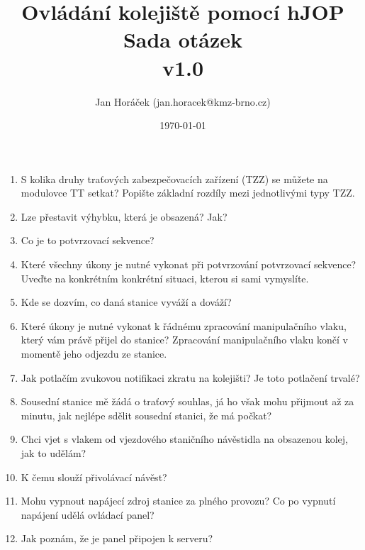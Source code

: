 \documentclass[12pt,a4paper]{article}
\begin{document}
\thispagestyle{empty}
\noindent

\title{
\Large Ovládání kolejiště pomocí hJOP\\
\LARGE Sada otázek\\
\small v1.0}
\author{Jan Horáček (jan.horacek@kmz-brno.cz)}
\date{\today}
\maketitle

\begin{enumerate}
	\item S kolika druhy traťových zabezpečovacích zařízení (TZZ) se můžete na modulovce TT setkat? Popište základní rozdíly mezi jednotlivými typy TZZ.
	
	\item Lze přestavit výhybku, která je obsazená? Jak?
	
	\item Co je to potvrzovací sekvence?
	
	\item Které všechny úkony je nutné vykonat při potvrzování potvrzovací sekvence? Uveďte na konkrétním konkrétní situaci, kterou si sami vymyslíte.
	
	\item Kde se dozvím, co daná stanice vyváží a dováží?
	
	\item Které úkony je nutné vykonat k řádnému zpracování manipulačního vlaku, který vám právě přijel do stanice? Zpracování manipulačního vlaku končí v momentě jeho odjezdu ze stanice.
	
	\item Jak potlačím zvukovou notifikaci zkratu na kolejišti? Je toto potlačení trvalé?
	
	\item Sousední stanice mě žádá o traťový souhlas, já ho však mohu přijmout až za minutu, jak nejlépe sdělit sousední stanici, že má počkat?
	
	\item Chci vjet s vlakem od vjezdového staničního návěstidla na obsazenou kolej, jak to udělám?
	
	\item K čemu slouží přivolávací návěst?
	
	\item Mohu vypnout napájecí zdroj stanice za plného provozu? Co po vypnutí napájení udělá ovládací panel?
	
	\item Jak poznám, že je panel připojen k serveru?
	

\end{enumerate}
\end{document}

